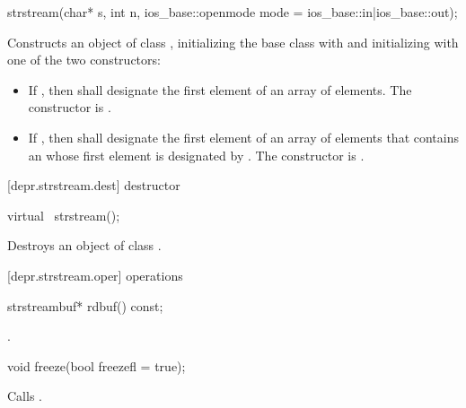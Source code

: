 %
\begin{itemdecl}
strstream(char* s, int n,
          ios_base::openmode mode = ios_base::in|ios_base::out);
\end{itemdecl}

\begin{itemdescr}
\pnum
\effects
Constructs an object of class
,
initializing the base class with
and initializing  with one of the two constructors:
\begin{itemize}
\item
If
,
then  shall designate the first element of an array of  elements.
The constructor is
.
\item
If
,
then  shall
designate the first element of an array of  elements that contains
an \ntbs whose first element is designated by .
The constructor is
.
%
\end{itemize}
\end{itemdescr}

[depr.strstream.dest]{ destructor}

%
\begin{itemdecl}
virtual ~strstream();
\end{itemdecl}

\begin{itemdescr}
\pnum
\effects
Destroys an object of class
.
\end{itemdescr}

[depr.strstream.oper]{ operations}

%
\begin{itemdecl}
strstreambuf* rdbuf() const;
\end{itemdecl}

\begin{itemdescr}
\pnum
\returns
{}.
\end{itemdescr}

%
\begin{itemdecl}
void freeze(bool freezefl = true);
\end{itemdecl}

\begin{itemdescr}
\pnum
\effects
Calls
.
\end{itemdescr}

